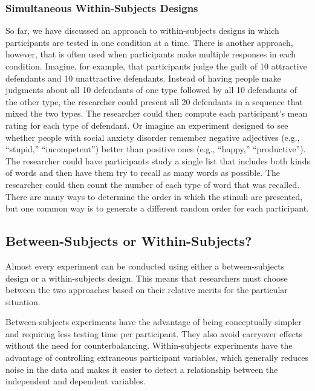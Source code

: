 \documentclass[
]{krantz}
\begin{document}
\hypertarget{simultaneous-within-subjects-designs}{%
\subsubsection*{Simultaneous Within-Subjects Designs}\label{simultaneous-within-subjects-designs}}


So far, we have discussed an approach to within-subjects designs in which participants are tested in one condition at a time. There is another approach, however, that is often used when participants make multiple responses in each condition. Imagine, for example, that participants judge the guilt of 10 attractive defendants and 10 unattractive defendants. Instead of having people make judgments about all 10 defendants of one type followed by all 10 defendants of the other type, the researcher could present all 20 defendants in a sequence that mixed the two types. The researcher could then compute each participant's mean rating for each type of defendant. Or imagine an experiment designed to see whether people with social anxiety disorder remember negative adjectives (e.g., ``stupid,'' ``incompetent'') better than positive ones (e.g., ``happy,'' ``productive''). The researcher could have participants study a single list that includes both kinds of words and then have them try to recall as many words as possible. The researcher could then count the number of each type of word that was recalled. There are many ways to determine the order in which the stimuli are presented, but one common way is to generate a different random order for each participant.

\hypertarget{between-subjects-or-within-subjects}{%
\subsection*{Between-Subjects or Within-Subjects?}\label{between-subjects-or-within-subjects}}


Almost every experiment can be conducted using either a between-subjects design or a within-subjects design. This means that researchers must choose between the two approaches based on their relative merits for the particular situation.

Between-subjects experiments have the advantage of being conceptually simpler and requiring less testing time per participant. They also avoid carryover effects without the need for counterbalancing. Within-subjects experiments have the advantage of controlling extraneous participant variables, which generally reduces noise in the data and makes it easier to detect a relationship between the independent and dependent variables.
\end{document}
